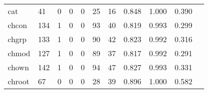 \begin{longtable}{lp{1.2cm}p{1.2cm}p{1.2cm}p{1.2cm}p{1.2cm}p{1.2cm}p{1.2cm}p{1.2cm}p{1.2cm}p{1.2cm}}
cat       &                                    41 &                                                  0 &                                                  0 &                                                  0 &                                                 25 &                                                 16 &                                         0.848 &                                              1.000 &                                              0.390 \\
chcon     &                                   134 &                                                  1 &                                                  0 &                                                  0 &                                                 93 &                                                 40 &                                         0.819 &                                              0.993 &                                              0.299 \\
chgrp     &                                   133 &                                                  1 &                                                  0 &                                                  0 &                                                 90 &                                                 42 &                                         0.823 &                                              0.992 &                                              0.316 \\
chmod     &                                   127 &                                                  1 &                                                  0 &                                                  0 &                                                 89 &                                                 37 &                                         0.817 &                                              0.992 &                                              0.291 \\
chown     &                                   142 &                                                  1 &                                                  0 &                                                  0 &                                                 94 &                                                 47 &                                         0.827 &                                              0.993 &                                              0.331 \\
chroot    &                                    67 &                                                  0 &                                                  0 &                                                  0 &                                                 28 &                                                 39 &                                         0.896 &                                              1.000 &                                              0.582 \\

\end{longtable}
